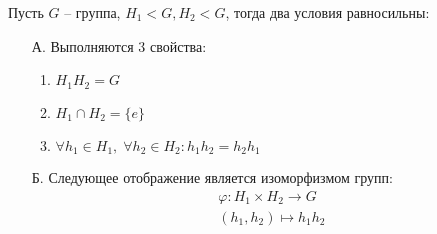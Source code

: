 \begin{theorem} Пусть $G$ -- группа, $H_1 < G, H_2 < G$, тогда два условия равносильны: 
    \begin{itemize}
        \item[А.] Выполняются 3 свойства: 
        \begin{enumerate}
            \item $H_1 H_2 = G$
            \item $H_1 \cap H_2 = \{e\}$
            \item $\forall h_1 \in H_1, \; \forall h_2 \in H_2 : h_1 h_2 = h_2 h_1$
        \end{enumerate} 
        \item[Б.] Следующее отображение является изоморфизмом групп:  
        \begin{gather*}
            \varphi : H_1 \times H_2 \longrightarrow G \\
            (h_1, h_2) \longmapsto h_1 h_2
        \end{gather*}
    \end{itemize}
\end{theorem}
